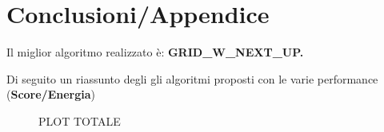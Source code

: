 \documentclass[12pt]{article}
\begin{document}
\section{Conclusioni/Appendice}

Il miglior algoritmo realizzato è: \textbf{GRID\_W\_NEXT\_UP.}

Di seguito un riassunto degli gli algoritmi proposti con le varie performance (\textbf{Score/Energia})

\begin{figure}[H]
    
    \qquad
    
    \label{fig:example}%
\end{figure}

\begin{figure}[H]
    
    \qquad
    \caption{PLOT TOTALE}%
    \label{fig:example}%
\end{figure}
\end{document}
